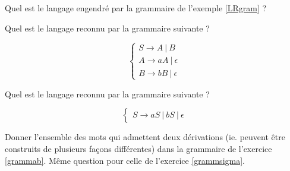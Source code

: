 \begin{exercice}
Quel est le langage engendré par la grammaire de l'exemple \ref{LRgram} ?
\end{exercice}

\begin{exercice}
\label{grammab}
Quel est le langage reconnu par la grammaire suivante ?

\[
\begin{cases}
S \rightarrow A~|~B \\
A \rightarrow aA~|~\epsilon \\
B \rightarrow bB~|~\epsilon
\end{cases}
\]

\end{exercice}

\begin{exercice}
\label{grammsigma}
Quel est le langage reconnu par la grammaire suivante ?

\[
\begin{cases}
S \rightarrow aS~|~bS~|~\epsilon 
\end{cases}
\]

\end{exercice}

\begin{exercice}
Donner l'ensemble des mots qui admettent deux dérivations (ie. peuvent être construits de plusieurs façons différentes) dans la grammaire de l'exercice \ref{grammab}. Même question pour celle de l'exercice \ref{grammsigma}.
\end{exercice}

